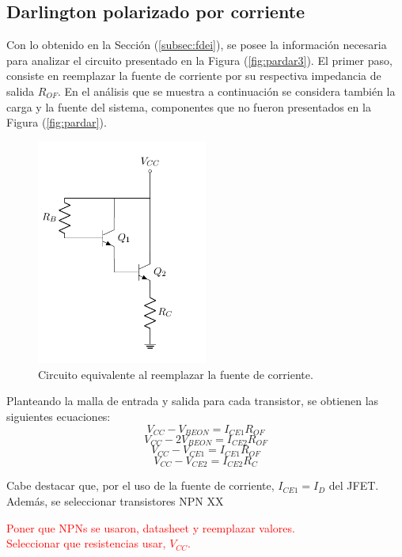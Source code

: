 \subsection{Darlington polarizado por corriente}
Con lo obtenido en la Sección (\ref{subsec:fdei}), se posee la información necesaria para analizar el circuito presentado en la Figura (\ref{fig:pardar3}). El primer paso, consiste en reemplazar la fuente de corriente por su respectiva impedancia de salida $R_{OF}$. En el análisis que se muestra a continuación se considera también la carga y la fuente del sistema, componentes que no fueron presentados en la Figura (\ref{fig:pardar}).
\begin{figure}[H]
\centering
	\includegraphics[width=0.5\textwidth, page=5]{Imagenes/ParDarlington.pdf}
	\caption{Circuito equivalente al reemplazar la fuente de corriente.}
	\label{fig:pardar4}
\end{figure}

Planteando la malla de entrada y salida para cada transistor, se obtienen las siguientes ecuaciones:
\begin{equation*}
	V_{CC} - V_{BEON} = I_{CE1} R_{OF}
\end{equation*}
\begin{equation*}
	V_{CC} - 2V_{BEON} = I_{CE2} R_{OF}
\end{equation*}
\begin{equation*}
	V_{CC} - V_{CE1} = I_{CE1} R_{OF}
\end{equation*}
\begin{equation*}
	V_{CC} - V_{CE2} = I_{CE2} R_{C}
\end{equation*}

Cabe destacar que, por el uso de la fuente de corriente, $I_{CE1} = I_{D}$ del JFET. Además, se seleccionar transistores NPN XX
\begin{center}
	\LARGE{\textcolor{red}{Poner que NPNs se usaron, datasheet y reemplazar valores.}} \\
	\LARGE{\textcolor{red}{Seleccionar que resistencias usar, $V_{CC}$.}}
\end{center}

